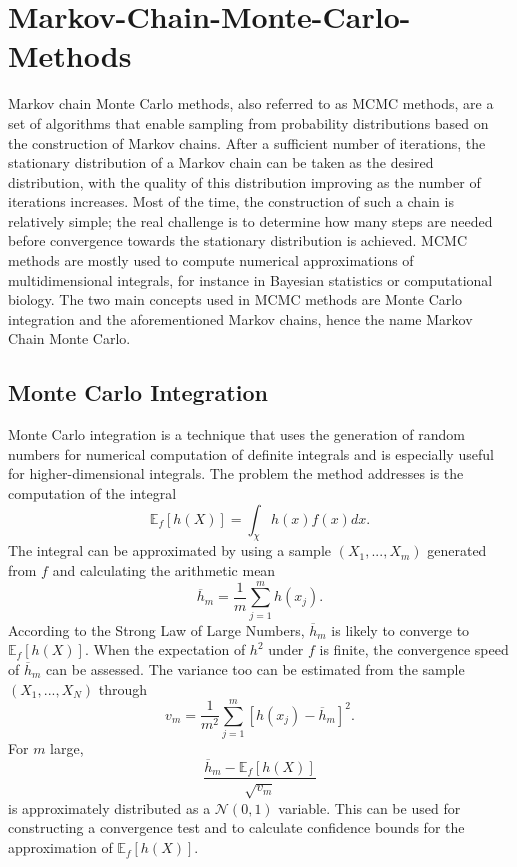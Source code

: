 \documentclass[12pt]{book}
\begin{document}
\section{Markov-Chain-Monte-Carlo-Methods}
Markov chain Monte Carlo methods, also referred to as MCMC methods, are a set of algorithms that enable sampling from probability distributions based on the construction of Markov chains. After a sufficient number of iterations, the stationary distribution of a Markov chain can be taken as the desired distribution, with the quality of this distribution improving as the number of iterations increases. Most of the time, the construction of such a chain is relatively simple; the real challenge is to determine how many steps are needed before convergence towards the stationary distribution is achieved. MCMC methods are mostly used to compute numerical approximations of multidimensional integrals, for instance in Bayesian statistics or computational biology. The two main concepts used in MCMC methods are Monte Carlo integration and the aforementioned Markov chains, hence the name Markov Chain Monte Carlo.
\subsection{Monte Carlo Integration}
Monte Carlo integration is a technique that uses the generation of random numbers for numerical computation of definite integrals and is especially useful for higher-dimensional integrals. The problem the method addresses is the computation of the integral
\begin{equation}
    \mathbb{E}_f\left[h\left(X\right)\right]=\int_\chi h(x)f(x)dx.
\end{equation}
The integral can be approximated by using a sample $\left(X_1,...,X_m\right)$ generated from $f$ and calculating the arithmetic mean
\begin{equation}
    \overline{h}_m=\frac{1}{m}\sum_{j=1}^mh\left(x_j\right).
\end{equation}
According to the Strong Law of Large Numbers, $\overline{h}_m$ is likely to converge to $\mathbb{E}_f\left[h\left(X\right)\right]$. When the expectation of $h^2$ under $f$ is finite, the convergence speed of $\overline{h}_m$ can be assessed. The variance too can be estimated from the sample $\left(X_1,...,X_N\right)$ through
\begin{equation}
    v_m=\frac{1}{m^2}\sum_{j=1}^m\left[h\left(x_j\right)-\overline{h}_m\right]^2.
\end{equation}
For $m$ large,
\begin{equation}
    \frac{\overline{h}_m-\mathbb{E}_f\left[h\left(X\right)\right]}{\sqrt{v_m}}
\end{equation}
is approximately distributed as a $\mathcal{N}(0,1)$ variable. This can be used for constructing a convergence test and to calculate confidence bounds for the approximation of $\mathbb{E}_f\left[h\left(X\right)\right]$\autocite[Cf.][]{robert2013monte}.
\end{document}
